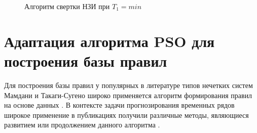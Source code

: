 \begin{figure}
	\caption{Алгоритм свертки НЗИ при $T_1=min$}
	\label{alg:ftv-reduction}
\end{figure}




\section{Адаптация алгоритма PSO для построения базы правил}

Для построения базы правил у популярных в литературе типов нечетких систем Мамдани и Такаги-Сугено широко применяется алгоритм формирования правил на основе данных \cite{Wang1992}. В контексте задачи прогнозирования временных рядов широкое применение в публикациях получили различные методы, являющиеся развитием или продолжением данного алгоритма \cite{Chellai2022}.

